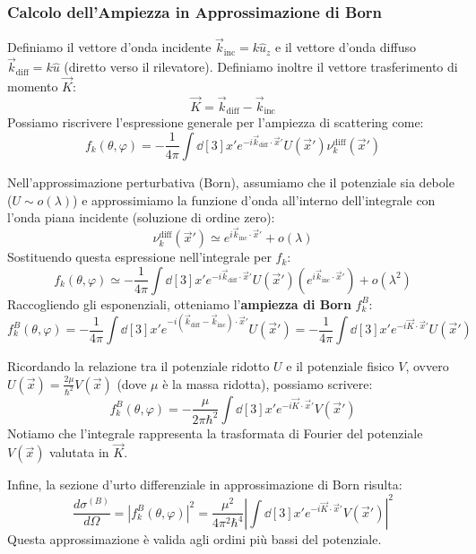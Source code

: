 \subsubsection{Calcolo dell'Ampiezza in Approssimazione di Born}

Definiamo il vettore d'onda incidente \( \vec{k}_{\text{inc}} = k \hat{u}_z \) e il vettore d'onda diffuso \( \vec{k}_{\text{diff}} = k \hat{u} \) (diretto verso il rilevatore).
Definiamo inoltre il vettore trasferimento di momento \( \vec{K} \):
\[
    \vec{K} = \vec{k}_{\text{diff}} - \vec{k}_{\text{inc}}
\]
Possiamo riscrivere l'espressione generale per l'ampiezza di scattering come:
\[
    f_k(\theta, \varphi) = -\frac{1}{4\pi} \int \dd[3]{x'} e^{-i \vec{k}_{\text{diff}} \cdot \vec{x}'} U(\vec{x}') \nu_k^{\text{diff}}(\vec{x}')
\]

Nell'approssimazione perturbativa (Born), assumiamo che il potenziale sia debole (\( U \sim o(\lambda) \)) e approssimiamo la funzione d'onda all'interno dell'integrale con l'onda piana incidente (soluzione di ordine zero):
\[
    \nu_k^{\text{diff}}(\vec{x}') \simeq e^{i \vec{k}_{\text{inc}} \cdot \vec{x}'} + o(\lambda)
\]
Sostituendo questa espressione nell'integrale per \( f_k \):
\[
    f_k(\theta, \varphi) \simeq -\frac{1}{4\pi} \int \dd[3]{x'} e^{-i \vec{k}_{\text{diff}} \cdot \vec{x}'} U(\vec{x}') \left( e^{i \vec{k}_{\text{inc}} \cdot \vec{x}'} \right) + o(\lambda^2)
\]
Raccogliendo gli esponenziali, otteniamo l'\textbf{ampiezza di Born} \( f_k^B \):
\begin{equation}
    f_k^B(\theta, \varphi) = -\frac{1}{4\pi} \int \dd[3]{x'} e^{-i (\vec{k}_{\text{diff}} - \vec{k}_{\text{inc}}) \cdot \vec{x}'} U(\vec{x}') = -\frac{1}{4\pi} \int \dd[3]{x'} e^{-i \vec{K} \cdot \vec{x}'} U(\vec{x}')
\end{equation}

Ricordando la relazione tra il potenziale ridotto \( U \) e il potenziale fisico \( V \), ovvero \( U(\vec{x}) = \frac{2\mu}{\hbar^2} V(\vec{x}) \) (dove \( \mu \) è la massa ridotta), possiamo scrivere:
\[
    f_k^B(\theta, \varphi) = -\frac{\mu}{2\pi\hbar^2} \int \dd[3]{x'} e^{-i \vec{K} \cdot \vec{x}'} V(\vec{x}')
\]
Notiamo che l'integrale rappresenta la trasformata di Fourier del potenziale \( V(\vec{x}) \) valutata in \( \vec{K} \).

Infine, la sezione d'urto differenziale in approssimazione di Born risulta:
\begin{equation}
    \frac{d\sigma^{(B)}}{d\Omega} = |f_k^B(\theta, \varphi)|^2 = \frac{\mu^2}{4\pi^2\hbar^4} \left| \int \dd[3]{x'} e^{-i \vec{K} \cdot \vec{x}'} V(\vec{x}') \right|^2
\end{equation}
Questa approssimazione è valida agli ordini più bassi del potenziale.

